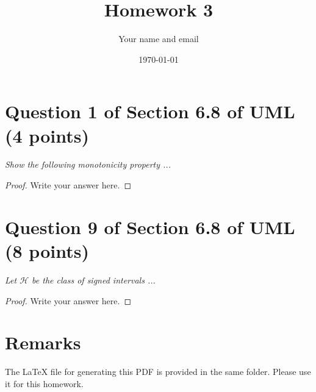 \documentclass{article}
\title{Homework 3}
\author{Your name and email}
\date{\today}
\begin{document}
\maketitle

\section{Question 1 of Section 6.8 of UML (4 points)}
\emph{Show the following monotonicity property ...}
\begin{proof}
    Write your answer here.
\end{proof}
\section{Question 9 of Section 6.8 of UML (8 points)}
\emph{Let $\mathcal{H}$ be the class of signed intervals ...}
\begin{proof}
    Write your answer here.
\end{proof}

\section{Remarks}

The \LaTeX{} file for generating this PDF is provided in the same folder. 
Please use it for this homework.
\end{document}
